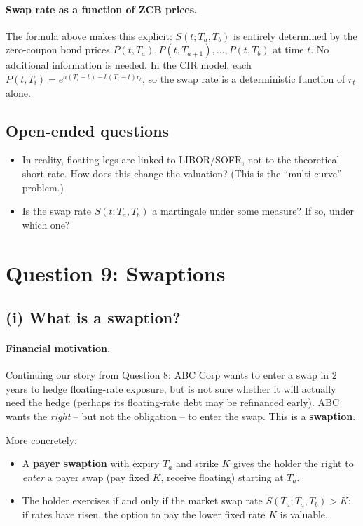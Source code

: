 \documentclass[11pt]{article}
\begin{document}
\paragraph{Swap rate as a function of ZCB prices.}  The formula above
makes this explicit: $S(t;T_a,T_b)$ is entirely determined by the
zero-coupon bond prices $P(t,T_a), P(t,T_{a+1}), \ldots, P(t,T_b)$ at
time $t$.  No additional information is needed.  In the CIR model, each
$P(t,T_i) = e^{a(T_i-t)-b(T_i-t)r_t}$, so the swap rate is a
deterministic function of $r_t$ alone.

\subsection*{Open-ended questions}
\begin{itemize}
  \item In reality, floating legs are linked to LIBOR/SOFR, not to the
  theoretical short rate.  How does this change the valuation?  (This is
  the ``multi-curve'' problem.)
  \item Is the swap rate $S(t;T_a,T_b)$ a martingale under some measure?
  If so, under which one?
\end{itemize}

\newpage
\section{Question 9: Swaptions}

\subsection{(i) What is a swaption?}

\paragraph{Financial motivation.}

Continuing our story from Question 8: ABC Corp wants to enter a swap in
2 years to hedge floating-rate exposure, but is not sure whether it will
actually need the hedge (perhaps its floating-rate debt may be refinanced
early).  ABC wants the \emph{right} -- but not the obligation -- to enter
the swap.  This is a \textbf{swaption}.

More concretely:
\begin{itemize}
  \item A \textbf{payer swaption} with expiry $T_a$ and strike $K$ gives
  the holder the right to \emph{enter} a payer swap (pay fixed $K$,
  receive floating) starting at $T_a$.
  \item The holder exercises if and only if the market swap rate
  $S(T_a;T_a,T_b) > K$: if rates have risen, the option to pay the lower
  fixed rate $K$ is valuable.
\end{itemize}
\end{document}
